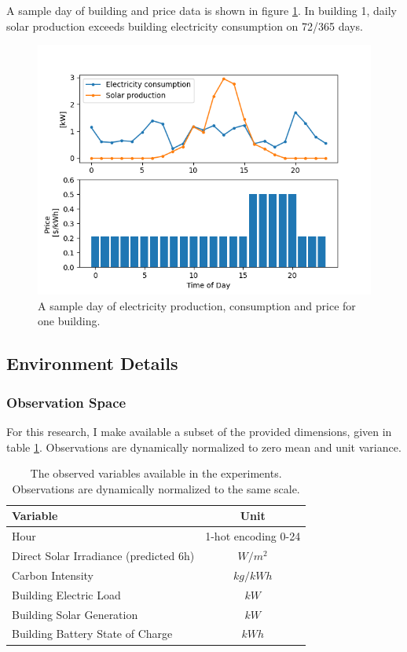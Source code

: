 A sample day of building and price data is shown in figure \ref{fig:data}.
In building 1, daily solar production exceeds building electricity consumption on 72/365 days.

\begin{figure}
    \includegraphics[width=\figurewidth]{figures/data.png}
    \caption{A sample day of electricity production, consumption and price for one building.}
    \label{fig:data}
\end{figure}

\subsection{Environment Details}
\subsubsection{Observation Space}
For this research, I make available a subset of the provided dimensions, given in table \ref{tab:observations}. Observations are dynamically normalized to zero mean and unit variance.

\begin{table}[h]
    \caption{The observed variables available in the experiments. Observations are dynamically normalized to the same scale.} \label{tab:observations}
    \centering
    \begin{tabular}{l|c}
        Variable & Unit \\ \hline
        Hour & 1-hot encoding 0-24 \\
        Direct Solar Irradiance (predicted 6h) & $W/m^2$ \\
        Carbon Intensity & $kg/kWh$ \\
        Building Electric Load & $kW$\\
        Building Solar Generation & $kW$\\
        Building Battery State of Charge & $kWh$\\
    \end{tabular}
\end{table}

